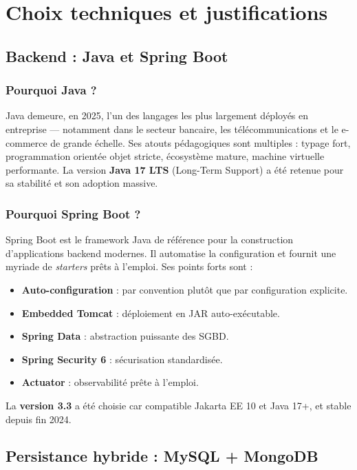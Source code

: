 \documentclass[11pt,a4paper,oneside]{report}
\begin{document}
\chapter{Choix techniques et justifications}

\section{Backend : Java et Spring Boot}

\subsection{Pourquoi Java ?}
Java demeure, en 2025, l'un des langages les plus largement déployés en
entreprise — notamment dans le secteur bancaire, les télécommunications et
le e-commerce de grande échelle. Ses atouts pédagogiques sont multiples :
typage fort, programmation orientée objet stricte, écosystème mature,
machine virtuelle performante. La version \textbf{Java 17 LTS} (Long-Term
Support) a été retenue pour sa stabilité et son adoption massive.

\subsection{Pourquoi Spring Boot ?}
Spring Boot est le framework Java de référence pour la construction
d'applications backend modernes. Il automatise la configuration et fournit
une myriade de \textit{starters} prêts à l'emploi. Ses points forts sont :

\begin{itemize}
  \item \textbf{Auto-configuration} : par convention plutôt que par
    configuration explicite.
  \item \textbf{Embedded Tomcat} : déploiement en JAR auto-exécutable.
  \item \textbf{Spring Data} : abstraction puissante des SGBD.
  \item \textbf{Spring Security 6} : sécurisation standardisée.
  \item \textbf{Actuator} : observabilité prête à l'emploi.
\end{itemize}

La \textbf{version 3.3} a été choisie car compatible Jakarta EE 10 et
Java 17+, et stable depuis fin 2024.

\section{Persistance hybride : MySQL + MongoDB}
\end{document}
